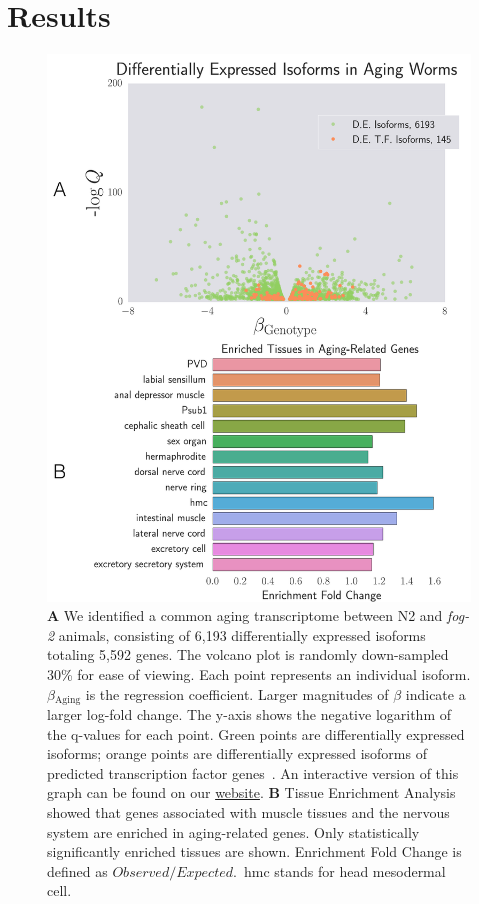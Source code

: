 \documentclass[10pt,letterpaper,twocolumn]{article}
\newcommand{\fog}{\emph{\mbox{fog-2}}}
\newcommand{\agen}{5,592}
\newcommand{\webref}{
\href{https://wormlabcaltech.github.io/Angeles_Leighton_2016/}{website}}
\begin{document}
\section*{Results}
\label{sec:results}
\begin{figure}[htbp]
\renewcommand{\familydefault}{\sfdefault}\normalfont{}
\centering
\includegraphics[width=\linewidth]{../output/figs/final_figs/aging_transcriptomics.pdf}
\caption{\textbf{A} We identified a common aging transcriptome between N2 and
\fog{} animals, consisting of 6,193 differentially expressed isoforms totaling
\agen{} genes. The volcano plot is randomly down-sampled 30\% for ease of
viewing. Each point represents an individual isoform. $\beta{}_\mathrm{Aging}$
is the regression coefficient. Larger magnitudes of $\beta$ indicate a larger
log-fold change. The y-axis shows the negative logarithm of the q-values for
each point. Green points are differentially expressed isoforms; orange points
are differentially expressed isoforms of  predicted transcription factor
genes~\cite{Reece-Hoyes2005}. An interactive version of this graph can be found
on our \webref{}. \textbf{B} Tissue Enrichment
Analysis~\cite{Angeles-Albores2016} showed that genes associated with muscle
tissues and the nervous system are enriched in aging-related genes.
Only statistically significantly enriched tissues are shown. Enrichment Fold
Change is defined as $Observed/Expected$.\ hmc stands for head mesodermal cell.
}
\label{fig:agingtranscriptome}
\end{figure}
\end{document}

